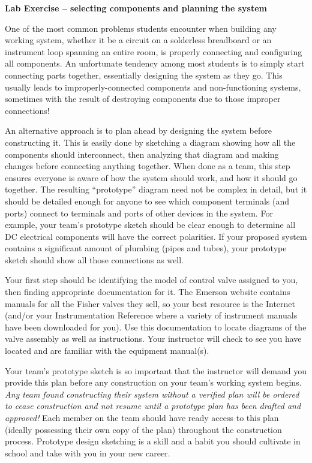 \documentclass[12pt,a4paper]{article}
\begin{document}
\begin{itemize}
\vfil \eject

\noindent
{\bf Lab Exercise -- selecting components and planning the system}

\vskip 5pt

One of the most common problems students encounter when building any working system, whether it be a circuit on a solderless breadboard or an instrument loop spanning an entire room, is properly connecting and configuring all components.  An unfortunate tendency among most students is to simply start connecting parts together, essentially designing the system as they go.  This usually leads to improperly-connected components and non-functioning systems, sometimes with the result of destroying components due to those improper connections!

An alternative approach is to plan ahead by designing the system before constructing it.  This is easily done by sketching a diagram showing how all the components should interconnect, then analyzing that diagram and making changes before connecting anything together.  When done as a team, this step ensures everyone is aware of how the system should work, and how it should go together.  The resulting ``prototype'' diagram need not be complex in detail, but it should be detailed enough for anyone to see which component terminals (and ports) connect to terminals and ports of other devices in the system.  For example, your team's prototype sketch should be clear enough to determine all DC electrical components will have the correct polarities.  If your proposed system contains a significant amount of plumbing (pipes and tubes), your prototype sketch should show all those connections as well.

\vskip 10pt

Your first step should be identifying the model of control valve assigned to you, then finding appropriate documentation for it.  The Emerson website contains manuals for all the Fisher valves they sell, so your best resource is the Internet (and/or your Instrumentation Reference where a variety of instrument manuals have been downloaded for you).  Use this documentation to locate diagrams of the valve assembly as well as instructions.  Your instructor will check to see you have located and are familiar with the equipment manual(s).

\vskip 10pt

Your team's prototype sketch is so important that the instructor will demand you provide this plan before any construction on your team's working system begins.  {\it Any team found constructing their system without a verified plan will be ordered to cease construction and not resume until a prototype plan has been drafted and approved!}  Each member on the team should have ready access to this plan (ideally possessing their own copy of the plan) throughout the construction process.  Prototype design sketching is a skill and a habit you should cultivate in school and take with you in your new career.


\end{itemize}
\end{document}
